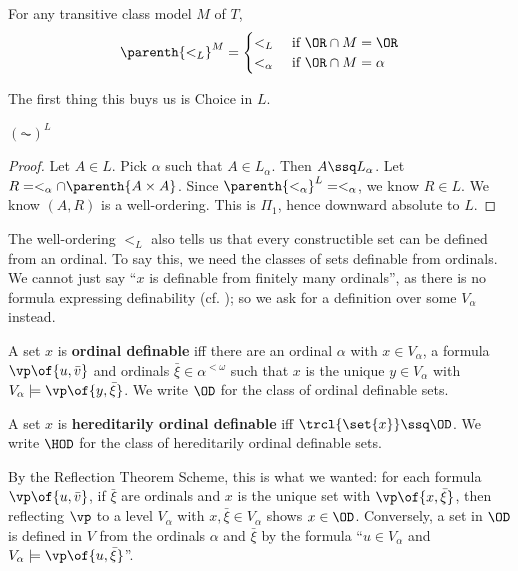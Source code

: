 For any transitive class model $M$ of $T$,
\begin{align*}
    \parenth{<_L}^M
    = \begin{cases}
        <_L & \text{ if } \OR \cap M = \OR \\
        <_{\alpha} & \text{ if } \OR \cap M = \alpha
    \end{cases}
\end{align*}

The first thing this buys us is Choice in $L$.

\begin{boxtheorem}[using $\ZF$ in $V$] \label{Ch3:Thm:AC_In_L}
    $(\AC)^L$
\end{boxtheorem}
\begin{proof}
    Let $A \in L$. Pick $\alpha$ such that $A \in L_{\alpha}$. Then $A \ssq L_{\alpha}$. Let $R = <_{\alpha} \cap \parenth{A \times A}$. Since $\parenth{<_{\alpha}}^L = <_{\alpha}$, we know $R \in L$. We know $(A, R)$ is a well-ordering. This is $\Pi_1$, hence downward absolute to $L$.
\end{proof}

The well-ordering $<_L$ also tells us that every constructible set can be defined from an ordinal. To say this, we need the classes of sets definable from ordinals. We cannot just say ``$x$ is definable from finitely many ordinals'', as there is no formula expressing definability (cf. ); so we ask for a definition over some $V_{\alpha}$ instead.

\begin{boxdefinition}
    A set $x$ is \textbf{ordinal definable} iff there are an ordinal $\alpha$ with $x \in V_{\alpha}$, a formula $\vp\of{u, \bar{v}}$ and ordinals $\bar{\xi} \in \alpha^{<\omega}$ such that $x$ is the unique $y \in V_{\alpha}$ with $V_{\alpha} \models \vp\of{y, \bar{\xi}}$. We write $\OD$ for the class of ordinal definable sets.

    A set $x$ is \textbf{hereditarily ordinal definable} iff $\trcl{\set{x}} \ssq \OD$. We write $\HOD$ for the class of hereditarily ordinal definable sets.
\end{boxdefinition}

By the Reflection Theorem Scheme, this is what we wanted: for each formula $\vp\of{u, \bar{v}}$, if $\bar{\xi}$ are ordinals and $x$ is the unique set with $\vp\of{x, \bar{\xi}}$, then reflecting $\vp$ to a level $V_{\alpha}$ with $x, \bar{\xi} \in V_{\alpha}$ shows $x \in \OD$. Conversely, a set in $\OD$ is defined in $V$ from the ordinals $\alpha$ and $\bar{\xi}$ by the formula ``$u \in V_{\alpha}$ and $V_{\alpha} \models \vp\of{u, \bar{\xi}}$''.

